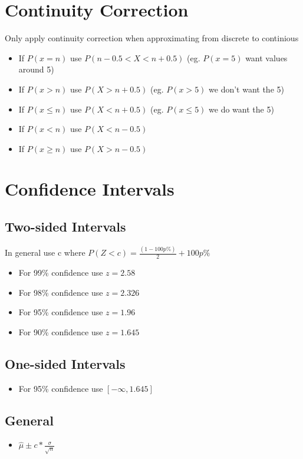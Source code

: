 \documentclass[12pt]{article}
\begin{document}
\section{Continuity Correction}
Only apply continuity correction when approximating from discrete to continious
\begin{itemize}
\item If $P(x=n)$ use $P(n-0.5 < X < n+0.5)$ (eg. $P(x=5)$ want values around 5)
\item If $P(x>n)$ use $P(X>n+0.5)$ (eg. $P(x>5)$ we don't want the 5)
\item If $P(x\leq n)$ use $P(X<n+0.5)$ (eg. $P(x\leq 5)$ we do want the 5)
\item If $P(x<n)$ use $P(X<n-0.5)$
\item If $P(x\geq n)$ use $P(X>n-0.5)$
\end{itemize}
\section{Confidence Intervals}
\subsection{Two-sided Intervals}
In general use c where $P(Z < c)= \frac{(1-100p\%)}{2}+100p\%$
\begin{itemize}
\item For 99\% confidence use $z=2.58$
\item For 98\% confidence use $z=2.326$
\item For 95\% confidence use $z=1.96$
\item For 90\% confidence use $z=1.645$
\end{itemize}
\subsection{One-sided Intervals}
\begin{itemize}
\item For 95\% confidence use $[-\infty, 1.645]$
\end{itemize}
\subsection{General}
\begin{itemize}
\item $\hat{\mu}\pm c*\frac{\sigma}{\sqrt{n}}$
\end{itemize}
\end{document}
